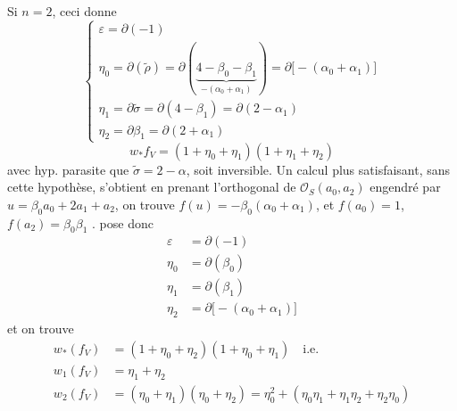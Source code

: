 \documentclass[11pt,a4paper]{article}
\begin{document}
Si $n = 2$, ceci donne
\[
\begin{cases}
\varepsilon = \partial(-1) \\
\eta_0 = \partial(\tilde\rho) = \partial(\underbrace{4 - \beta_0 - \beta_1}_{-(\alpha_0 + \alpha_1)}) = \partial\bigl[-(\alpha_0 + \alpha_1)\bigr] \\
\eta_1 = \partial\tilde\sigma = \partial(4 - \beta_1) = \partial(2 - \alpha_1) \\
\eta_2 = \partial\beta_1 = \partial(2 + \alpha_1)
\end{cases}
\]
\[
w_* f_V = (1 + \eta_0 + \eta_1)(1 + \eta_1 + \eta_2)
\]
avec hyp. parasite que $\tilde\sigma = 2 - \alpha$, \struck{\ill{}} soit inversible. Un calcul plus satisfaisant, sans cette hypothèse, s'obtient en prenant l'orthogonal de $\mathcal{O}_S(a_0, a_2)$ engendré par $u = \beta_0 a_0 + 2 a_1 + a_2$, on trouve $f(u) = -\beta_0(\alpha_0 + \alpha_1)$, et $f(a_0) = 1$, $f(a_2) = \beta_0\beta_1$ . \ill{} pose donc
\[
\begin{aligned}
\varepsilon &= \partial(-1) \\
\eta_0 &= \partial(\beta_0) \\
\eta_1 &= \partial(\beta_1) \\
\eta_2 &= \partial\bigl[-(\alpha_0 + \alpha_1)\bigr]
\end{aligned}
\]
et on trouve
\[
\begin{aligned}
w_*(f_V) &= (1 + \eta_0 + \eta_2)(1 + \eta_0 + \eta_1) \quad \text{i.e.} \\
w_1(f_V) &= \eta_1 + \eta_2 \\
w_2(f_V) &= (\eta_0 + \eta_1)(\eta_0 + \eta_2) = \eta_0^2 + (\eta_0\eta_1 + \eta_1\eta_2 + \eta_2\eta_0)
\end{aligned}
\]
\end{document}
